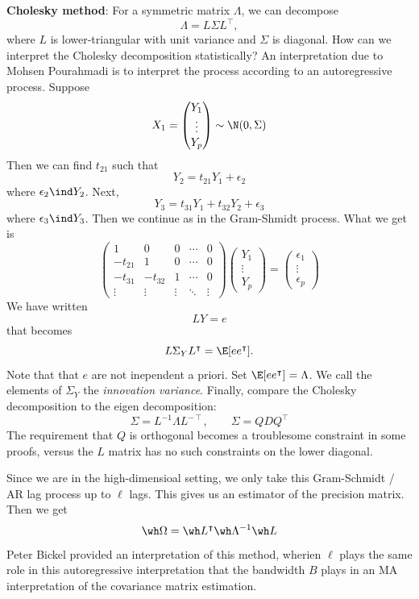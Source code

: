 \textbf{Cholesky method}: For a symmetric matrix \(\Lambda\), we can decompose
\[\Lambda = L \Sigma L^\intercal,\]
where \(L\) is lower-triangular with unit variance and \(\Sigma\) is diagonal. How can we interpret the Cholesky decomposition statistically? An interpretation due to Mohsen Pourahmadi is to interpret the process according to an autoregressive process. Suppose
\[X_1 =
\begin{pmatrix}
Y_1 \\
\vdots \\
Y_p
\end{pmatrix}
\sim \N(0, \Sigma)\]
Then we can find \(t_{21}\) such that
\[Y_2 = t_{21} Y_1 + \epsilon_2\]
where \(\epsilon_2 \ind Y_2\). Next,
\[Y_3 = t_{31} Y_1 + t_{32} Y_2 + \epsilon_3\]
where \(\epsilon_3 \ind Y_3\). Then we continue as in the Gram-Shmidt process. What we get is
\[\begin{pmatrix}
1 & 0 & 0 & \cdots & 0 \\
-t_{21} & 1 & 0 & \cdots & 0 \\
-t_{31} & -t_{32} & 1 & \cdots & 0 \\
\vdots & \vdots & \vdots & \ddots & \vdots
\end{pmatrix}
\begin{pmatrix}
Y_1 \\
\vdots \\
Y_p
\end{pmatrix}
=
\begin{pmatrix}
\epsilon_1 \\
\vdots \\
\epsilon_p
\end{pmatrix}\]
We have written
\[LY = e\]
that becomes
\[L \Sigma_Y L^\intercal = \E[e e^\intercal].\]
Note that that \(e\) are not inependent a priori. Set \(\E[ee^\intercal] = \Lambda\). We call the elements of \(\Sigma_Y\) the \emph{innovation variance}. Finally, compare the Cholesky decomposition to the eigen decomposition:
\[\Sigma = L^{-1} \Lambda L^{-\intercal}, \qquad \Sigma = Q D Q^{\intercal}\]
The requirement that \(Q\) is orthogonal becomes a troublesome constraint in some proofs, versus the \(L\) matrix has no such constraints on the lower diagonal.

Since we are in the high-dimensioal setting, we only take this Gram-Schmidt / AR lag process up to \(\ell\) lags. This gives us an estimator of the precision matrix. Then we get
\[\wh \Omega = \wh L^{\intercal} \wh \Lambda^{-1} \wh L\]
Peter Bickel provided an interpretation of this method, wherien \(\ell\) plays the same role in this autoregressive interpretation that the bandwidth \(B\) plays in an MA interpretation of the covariance matrix estimation.

